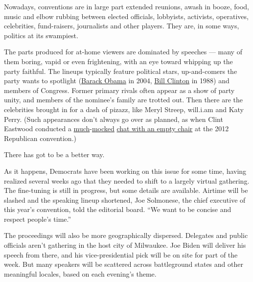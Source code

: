 Nowadays, conventions are in large part extended reunions, awash in
booze, food, music and elbow rubbing between elected officials,
lobbyists, activists, operatives, celebrities, fund-raisers, journalists
and other players. They are, in some ways, politics at its swampiest.

The parts produced for at-home viewers are dominated by speeches ---
many of them boring, vapid or even frightening, with an eye toward
whipping up the party faithful. The lineups typically feature political
stars, up-and-comers the party wants to spotlight
(\href{https://www.nytimes3xbfgragh.onion/2004/07/27/politics/campaign/barack-obamas-remarks-to-the-democratic-national.html}{Barack
Obama} in 2004,
\href{https://www.vox.com/2016/7/26/12285312/bill-clinton-dnc-1988-speaker-late-night}{Bill
Clinton} in 1988) and members of Congress. Former primary rivals often
appear as a show of party unity, and members of the nominee's family are
trotted out. Then there are the celebrities brought in for a dash of
pizazz, like Meryl Streep, will.i.am and Katy Perry. (Such appearances
don't always go over as planned, as when Clint Eastwood conducted a
\href{https://www.washingtonpost.com/news/morning-mix/wp/2016/08/04/clint-eastwood-explains-and-regrets-his-speech-to-an-empty-chair/}{much}-\href{https://www.washingtonpost.com/blogs/compost/post/clint-eastwood-delivers-greatest-speech-in-us-history-mitt-romney-also-there/2012/08/31/cd8485fe-f320-11e1-adc6-87dfa8eff430_blog.html?itid=lk_inline_manual_6}{mocked}
\href{https://www.nytimes3xbfgragh.onion/video/us/politics/100000001752472/clint-eastwoods-rnc-speech.html}{chat
with an empty chair} at the 2012 Republican convention.)

There has got to be a better way.

As it happens, Democrats have been working on this issue for some time,
having realized several weeks ago that they needed to shift to a largely
virtual gathering. The fine-tuning is still in progress, but some
details are available. Airtime will be slashed and the speaking lineup
shortened, Joe Solmonese, the chief executive of this year's convention,
told the editorial board. ``We want to be concise and respect people's
time.''

The proceedings will also be more geographically dispersed. Delegates
and public officials aren't gathering in the host city of Milwaukee. Joe
Biden will deliver his speech from there, and his vice-presidential pick
will be on site for part of the week. But many speakers will be
scattered across battleground states and other meaningful locales, based
on each evening's theme.

